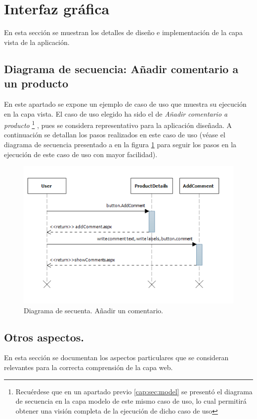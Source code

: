 \documentclass{article}
\begin{document}
\section{Interfaz gráfica}
	En esta sección se muestran los detalles de diseño e implementación de la capa vista de la aplicación.

\subsection{Diagrama de secuencia: Añadir comentario a un producto}
	En este apartado se expone un ejemplo de caso de uso que muestra su ejecución en la capa vista. El caso de uso elegido ha sido el de \emph{Añadir comentario a producto}
\footnote{Recuérdese que en un apartado previo \ref{cap:sec:model} se presentó el diagrama de secuencia en la capa modelo de este mismo caso de uso, lo cual permitirá obtener una visión completa de la ejecución de dicho caso de uso}
, pues se considera representativo para la aplicación diseñada. A continuación se detallan los pasos realizados en este caso de uso (véase el diagrama de secuencia presentado a en la figura \ref{fig:AddCommentLabelUI} para seguir los pasos en la ejecución de este caso de uso con mayor facilidad).

\begin{figure}[h]
  \centering
    \includegraphics{img/AddCommentLabelUI.png}
  \caption{Diagrama de secuenta. Añadir un comentario.}
  \label{fig:AddCommentLabelUI}
\end{figure}		
	

\subsection{Otros aspectos.}
	En esta sección se documentan los aspectos particulares que se consideran relevantes para la correcta comprensión de la capa web.
	
\end{document}
